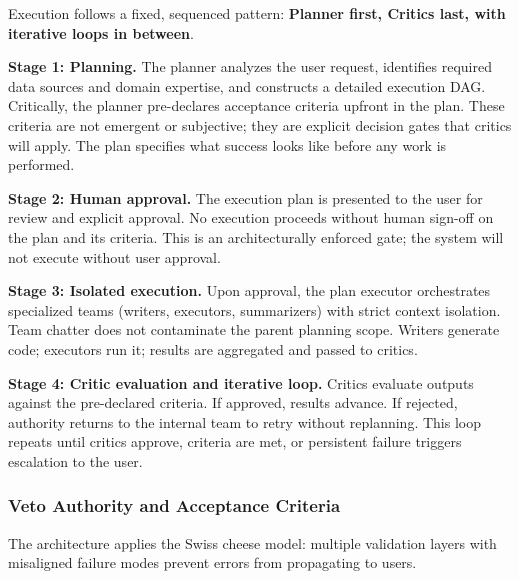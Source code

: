 \documentclass[sigconf]{acmart}
\begin{document}
Execution follows a fixed, sequenced pattern: \textbf{Planner first, Critics last, with iterative loops in between}.

\textbf{Stage 1: Planning.} The planner analyzes the user request, identifies required data sources and domain expertise, and constructs a detailed execution DAG. Critically, the planner pre-declares acceptance criteria upfront in the plan. These criteria are not emergent or subjective; they are explicit decision gates that critics will apply. The plan specifies what success looks like before any work is performed.

\textbf{Stage 2: Human approval.} The execution plan is presented to the user for review and explicit approval. No execution proceeds without human sign-off on the plan and its criteria. This is an architecturally enforced gate; the system will not execute without user approval.

\textbf{Stage 3: Isolated execution.} Upon approval, the plan executor orchestrates specialized teams (writers, executors, summarizers) with strict context isolation. Team chatter does not contaminate the parent planning scope. Writers generate code; executors run it; results are aggregated and passed to critics.

\textbf{Stage 4: Critic evaluation and iterative loop.} Critics evaluate outputs against the pre-declared criteria. If approved, results advance. If rejected, authority returns to the internal team to retry without replanning. This loop repeats until critics approve, criteria are met, or persistent failure triggers escalation to the user.

\subsubsection{Veto Authority and Acceptance Criteria}

The architecture applies the Swiss cheese model: multiple validation layers with misaligned failure modes prevent errors from propagating to users.
\end{document}
